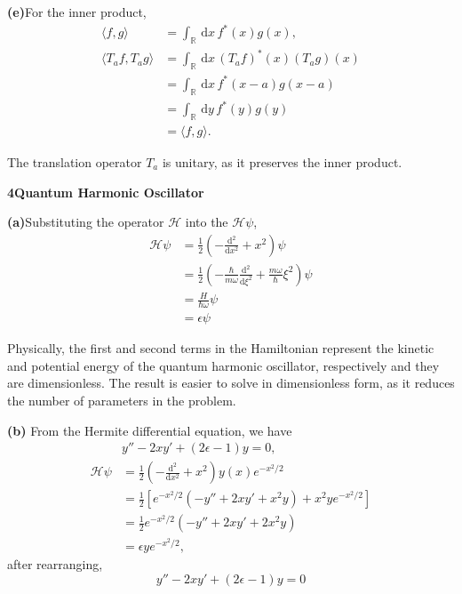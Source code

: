 \documentclass[12pt]{article}
\newcommand{\problem}[2]{%
    \par\vspace{1em}
    \noindent\textbf{#1\quad #2}
    \par\smallskip
}
\begin{document}
\noindent\textbf{(e)}\quad For the inner product,
\begin{equation}
\begin{aligned}
    \langle f,g  \rangle &= \int_{\mathbb{R}}\, \mathrm{d}x\, f^*(x) g(x),\\
    \langle T_a f, T_ag  \rangle &= \int_{\mathbb{R}}\, \mathrm{d}x\, (T_a f)^*(x) (T_a g)(x)\\
    &= \int_{\mathbb{R}}\, \mathrm{d}x\, f^*(x-a) g(x-a)\\
    &= \int_{\mathbb{R}}\, \mathrm{d}y\, f^*(y) g(y)\\
    &= \langle f,g  \rangle.
\end{aligned}
\end{equation}

The translation operator $T_a$ is unitary, as it preserves the inner product.

\pagebreak
\problem{4}{Quantum Harmonic Oscillator}
\noindent\textbf{(a)}\quad Substituting the operator $\mathcal{H}$ into the $\mathcal{H}\psi$,
\begin{equation}
\begin{aligned}
    \mathcal{H}\psi &= \frac{1}{2} \left(-\frac{\mathrm{d^2}}{\mathrm{d}x^2} + x^2\right) \psi\\
    &= \frac{1}{2} \left(-\frac{\hbar}{m\omega}\frac{\mathrm{d^2}}{\mathrm{d}\xi^2} + \frac{m\omega}{\hbar} \xi^2\right) \psi\\
    &= \frac{H}{\hbar \omega} \psi\\
    &= \epsilon \psi
\end{aligned}
\end{equation} 

Physically, the first and second terms in the Hamiltonian represent the kinetic and potential energy of the quantum harmonic oscillator, respectively and they are dimensionless. The result is easier to solve in dimensionless form, as it reduces the number of parameters in the problem.

\smallbreak
\smallbreak
\noindent\textbf{(b)} \quad From the Hermite differential equation, we have
\begin{equation}
\begin{aligned}
    &y''-2xy'+(2\epsilon-1)y = 0,\\
    \mathcal{H}\psi &= \frac{1}{2} \left(-\frac{\mathrm{d^2}}{\mathrm{d}x^2} + x^2\right) y(x)e^{-x^2/2}\\
    &= \frac{1}{2} \left[ e^{-x^2/2} \left(-y''+2xy'+x^2y\right) +x^2ye^{-x^2/2} \right]\\
    &= \frac{1}{2} e^{-x^2/2} (-y''+2xy'+2x^2y)\\
    &= \epsilon y e^{-x^2/2},
\end{aligned}
\end{equation}
after rearranging,
\begin{equation}
    y''-2xy'+(2\epsilon-1)y = 0
\end{equation}
\end{document}

